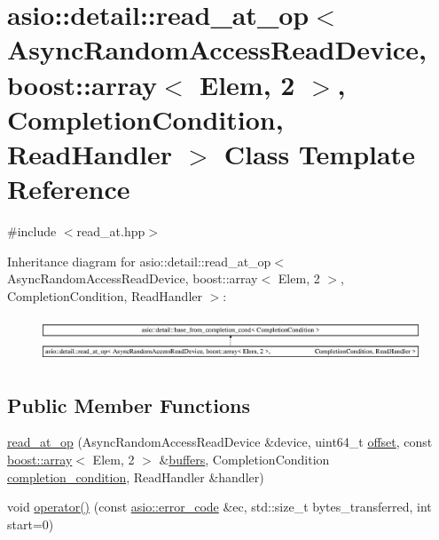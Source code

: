 \hypertarget{classasio_1_1detail_1_1read__at__op_3_01_async_random_access_read_device_00_01boost_1_1array_3_00756f1b0c223a71b75bb1b3f8c0f0e31}{}\section{asio\+:\+:detail\+:\+:read\+\_\+at\+\_\+op$<$ Async\+Random\+Access\+Read\+Device, boost\+:\+:array$<$ Elem, 2 $>$, Completion\+Condition, Read\+Handler $>$ Class Template Reference}
\label{classasio_1_1detail_1_1read__at__op_3_01_async_random_access_read_device_00_01boost_1_1array_3_00756f1b0c223a71b75bb1b3f8c0f0e31}


{\ttfamily \#include $<$read\+\_\+at.\+hpp$>$}

Inheritance diagram for asio\+:\+:detail\+:\+:read\+\_\+at\+\_\+op$<$ Async\+Random\+Access\+Read\+Device, boost\+:\+:array$<$ Elem, 2 $>$, Completion\+Condition, Read\+Handler $>$\+:\begin{figure}[H]
\begin{center}
\leavevmode
\includegraphics[height=1.325444cm]{classasio_1_1detail_1_1read__at__op_3_01_async_random_access_read_device_00_01boost_1_1array_3_00756f1b0c223a71b75bb1b3f8c0f0e31}
\end{center}
\end{figure}
\subsection*{Public Member Functions}
\begin{DoxyCompactItemize}
\item 
\hyperlink{classasio_1_1detail_1_1read__at__op_3_01_async_random_access_read_device_00_01boost_1_1array_3_00756f1b0c223a71b75bb1b3f8c0f0e31_a8b19ed0d3895ca487ec9b03454d73f8c}{read\+\_\+at\+\_\+op} (Async\+Random\+Access\+Read\+Device \&device, uint64\+\_\+t \hyperlink{group__async__read__at_ga8dcdb41a4adfd6fe5322b5dd666d9f29}{offset}, const \hyperlink{classboost_1_1array}{boost\+::array}$<$ Elem, 2 $>$ \&\hyperlink{group__async__read_ga54dede45c3175148a77fe6635222c47d}{buffers}, Completion\+Condition \hyperlink{group__async__read_gae2e215d5013596cc2b385bb6c13fa518}{completion\+\_\+condition}, Read\+Handler \&handler)
\item 
void \hyperlink{classasio_1_1detail_1_1read__at__op_3_01_async_random_access_read_device_00_01boost_1_1array_3_00756f1b0c223a71b75bb1b3f8c0f0e31_aa7fcd903e20599176d4b4ff4f9ea1f87}{operator()} (const \hyperlink{classasio_1_1error__code}{asio\+::error\+\_\+code} \&ec, std\+::size\+\_\+t bytes\+\_\+transferred, int start=0)
\end{DoxyCompactItemize}
